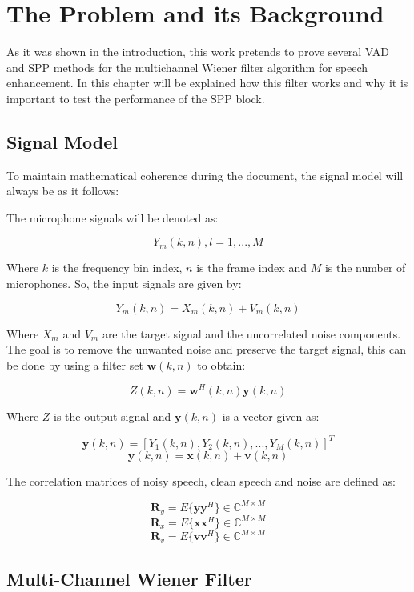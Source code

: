\chapter{The Problem and its Background}

As it was shown in the introduction, this work pretends to prove several VAD and SPP methods for the multichannel Wiener filter algorithm for speech enhancement. In this chapter will be explained how this filter works and why it is important to test the performance of the SPP block.


\section{Signal Model}

To maintain mathematical coherence during the document, the signal model will always be as it follows:

The microphone signals will be denoted as:

$$Y_m(k,n),l=1,...,M$$

Where $k$ is the frequency bin index, $n$ is the frame index and $M$ is the number of microphones. So, the input signals are given by:

$$Y_m(k,n)=X_m(k,n)+V_m(k,n)$$

Where $X_m$ and $V_m$ are the target signal and the uncorrelated noise components. The goal is to remove the unwanted noise and preserve the target signal, this can be done by using a filter set $\textbf{w}(k,n)$ to obtain:

$$Z(k,n)=\textbf{w}^H(k,n)\textbf{y}(k,n)$$



Where $Z$ is the output signal and $\textbf{y}(k,n)$ is a vector given as:

$$\textbf{y}(k,n) = [Y_1(k,n), Y_2(k,n),...,Y_M(k,n)]^T $$
$$\textbf{y}(k,n)= \textbf{x}(k,n)+\textbf{v}(k,n)$$

The correlation matrices of noisy speech, clean speech and noise are defined as:

$$\textbf{R}_y=E\{\textbf{yy}^H\}  	\in \mathds{C}^{M\times M}$$
$$\textbf{R}_x=E\{\textbf{xx}^H\}	\in \mathds{C}^{M\times M}$$
$$\textbf{R}_v=E\{\textbf{vv}^H\}	\in \mathds{C}^{M\times M}$$



\section{Multi-Channel Wiener Filter}

